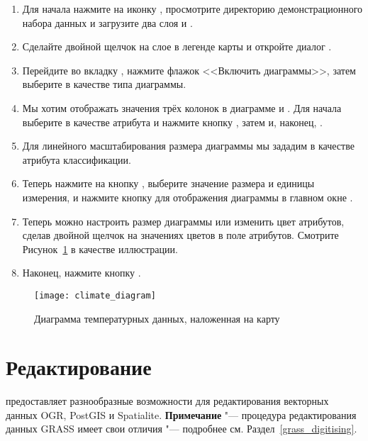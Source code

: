 \begin{enumerate}
\item Для начала нажмите на иконку ,
просмотрите директорию демонстрационного набора данных \qg и загрузите два слоя
 и .
\item Сделайте двойной щелчок на слое  в легенде карты
и откройте диалог .
\item Перейдите во вкладку , нажмите флажок
  <<Включить диаграммы>>, затем выберите
 в качестве типа диаграммы.
\item Мы хотим отображать значения трёх колонок в диаграмме
 и . Для начала выберите
 в качестве атрибута и нажмите кнопку ,
затем  и, наконец, .
\item Для линейного масштабирования размера диаграммы мы зададим 
в качестве атрибута классификации.
\item Теперь нажмите на кнопку , выберите
значение размера и единицы измерения, и нажмите кнопку  для
отображения диаграммы в главном окне \qg.
\item Теперь можно настроить размер диаграммы или изменить цвет атрибутов,
сделав двойной щелчок на значениях цветов в поле атрибутов. Смотрите
Рисунок~\ref{fig:climatediagram} в качестве иллюстрации.
\item Наконец, нажмите кнопку .
\end{enumerate}

\begin{figure}[ht]
   \centering
   \texttt{[image: climate\_diagram]}
   \caption{Диаграмма температурных данных, наложенная на карту \wincaption}\label{fig:climatediagram}
\end{figure}

\section{Редактирование}

\qg предоставляет разнообразные возможности для редактирования векторных
данных OGR, PostGIS и Spatialite. \textbf{Примечание} "--- процедура
редактирования данных GRASS имеет свои отличия "--- подробнее см.
Раздел~\ref{grass_digitising}.

